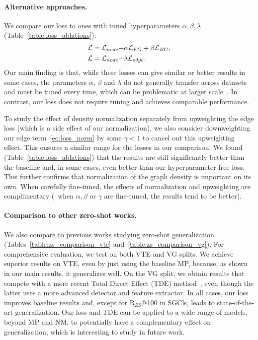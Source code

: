 \paragraph{Alternative approaches.}
We compare our loss to ones with tuned hyperparameters $\alpha,\beta,\lambda$ (Table~\ref{table:loss_ablations}):
\begin{align}
{\cal L} = {\cal L}_{node} + &\alpha {\cal L}_{FG}  + \beta {\cal L}_{BG},\label{eq:loss_tune1} \\
{\cal L} = {\cal L}_{node} + &\lambda {\cal L}_{edge}.\label{eq:loss_tune2}
\end{align}
Our main finding is that, while these losses can give similar or better results in some cases, the parameters $\alpha$, $\beta$ and $\lambda$ do not generally transfer across datasets and must be tuned every time, which can be problematic at larger scale~\citep{zhang2019large}. In contrast, our loss does not require tuning and achieves comparable performance.



To study the effect of density normalization separately from upweighting the edge loss (which is a side effect of our normalization), we also consider downweighting our edge term~\eqref{eq:loss_norm} by some $\gamma<1$ to cancel out this upweighting effect.
This ensures a similar range for the losses in our comparison.
We found (Table~\ref{table:loss_ablations}) that the results are still significantly better than the baseline and, in some cases, even better than our hyperparameter-free loss. This further confirms that normalization of the graph density is important on its own. When carefully fine-tuned, the effects of normalization and upweighting are complimentary (\eg~when $\alpha,\beta$ or $\gamma$ are fine-tuned, the results tend to be better).

\vspace{-6pt}
\paragraph{Comparison to other zero-shot works.}
We also compare to previous works studying zero-shot generalization (Tables~\ref{table:zs_comparison_vte} and~\ref{table:zs_comparison_vg}). %
For comprehensive evaluation, we test on both VTE and VG splits. We achieve superior results on VTE, even by just using the baseline MP, because, as shown in our main results, it generalizes well. On the VG split, we obtain results that compete with a more recent Total Direct Effect (TDE) method~\citep{tang2020unbiased}, even though the latter uses a more advanced detector and feature extractor.
In all cases, our loss improves baseline results and, except for R$_{ZS}$@100 in SGCls, leads to state-of-the-art generalization.
Our loss and TDE can be applied to a wide range of models, beyond MP and NM, to potentially have a complementary effect on generalization, which is interesting to study in future work.


